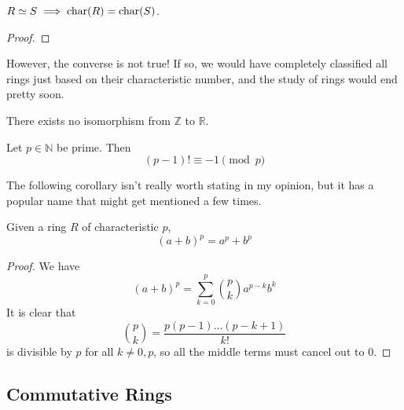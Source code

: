   \begin{theorem}
    $R \simeq S \implies \operatorname{char}(R) = \operatorname{char}(S)$. 
  \end{theorem}
  \begin{proof}
    
  \end{proof}

  However, the converse is not true! If so, we would have completely classified all rings just based on their characteristic number, and the study of rings would end pretty soon. 

  \begin{example}
    There exists no isomorphism from $\mathbb{Z}$ to $\mathbb{R}$. 
  \end{example}

  \begin{theorem}
    Let $p \in \mathbb{N}$ be prime. Then 
    \begin{equation}
      (p-1)! \equiv -1 \pmod{p}
    \end{equation}
  \end{theorem}
  
  The following corollary isn't really worth stating in my opinion, but it has a popular name that might get mentioned a few times. 

  \begin{corollary}
    Given a ring $R$ of characteristic $p$, 
    \begin{equation}
      (a + b)^p = a^p + b^p
    \end{equation}
  \end{corollary}
  \begin{proof}
    We have 
    \begin{equation}
      (a + b)^p = \sum_{k = 0}^p \binom{p}{k} a^{p-k} b^{k}
    \end{equation}
    It is clear that 
    \begin{equation}
      \binom{p}{k} = \frac{p (p-1) ... (p - k+1)}{k!}
    \end{equation}
    is divisible by $p$ for all $k \neq 0, p$, so all the middle terms must cancel out to $0$. 
  \end{proof}

\subsection{Commutative Rings} 


